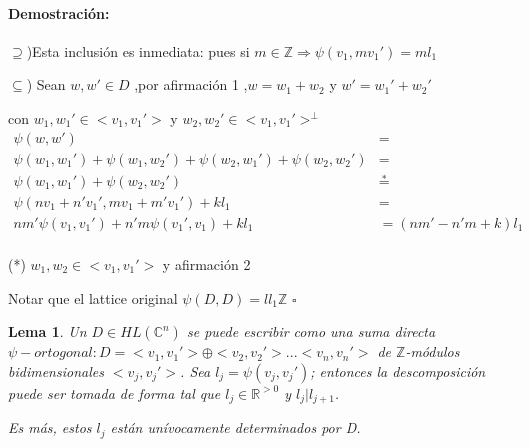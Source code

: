 \documentclass[12pt]{article}
\newtheorem{lemma}{Lema}
\newenvironment{proof}{\paragraph{Demostración:}}{\hfill$\square$}
\begin{document}
\begin{proof}
 $\supseteq$)Esta inclusión es inmediata: pues si $m \in \mathbb{Z} \Rightarrow \psi(v_1,m v_1') = m l_1$
 
 $\subseteq$) Sean $w,w' \in D$ ,por afirmación 1 ,$w = w_1 +w_2$  y $w'=w_1' +w_2'$
 
  con $w_1,w_1' \in <v_1,v_1'>$ y  $w_2,w_2' \in <v_1,v_1'>^\bot$ 
 $$\begin{aligned}
 \psi(w,w')&=\\
 \psi(w_1,w_1')+ \psi(w_1,w_2')+ \psi(w_2,w_1')+\psi(w_2,w_2')&=\\
 \psi(w_1,w_1')+\psi(w_2,w_2')& \stackrel{*}{=} \\ 
 \psi(n v_1+n' v_1',m v_1+m' v_1') + k l_1 &=\\
 n m' \psi(v_1,v_1')+n' m \psi(v_1',v_1)+ k l_1 &= (n m' - n'm+k)l_1\\
 \end{aligned}$$
 \newline 
 
 (*) $w_1,w_2 \in <v_1,v_1'>$ y afirmación 2
 
 Notar que el lattice original $\psi(D,D)= l l_1 \mathbb{Z} $
\end{proof}

\begin{lemma} \label{1.8}
 Un $D \in HL(\mathbb{C}^n)$ se puede escribir como una suma directa $\psi-ortogonal : D=<v_1,v_1'>\oplus<v_2,v_2'>...<v_n,v_n'>$
 de $\mathbb{Z}$-módulos bidimensionales $<v_j,v_j'>$. Sea $l_j=\psi(v_j,v_j')$; entonces la descomposición puede ser tomada 
 de forma tal que $l_j \in \mathbb{R}^{>0}$ y $l_j | l_{j+1}$.
 
 Es más, estos $l_j$ están unívocamente determinados por D.
\end{lemma}
\end{document}

